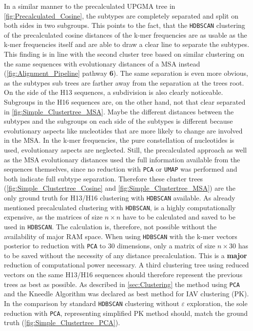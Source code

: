 In a similar manner to the precalculated \gls{UPGMA} tree in \autoref{fig:Precalculated_Cosine}, the subtypes are completely separated and split on both sides in two subgroups. This points to the fact, that the \texttt{HDBSCAN} clustering of the precalculated cosine distances of the k-mer frequencies are as usable as the k-mer frequencies itself and are able to draw a clear line to separate the subtypes. This finding is in line with the second cluster tree based on similar clustering on the same sequences with evolutionary distances of a \gls{MSA} instead (\autoref{fig:Alignment_Pipeline} pathway \textsf{\textbf{6}}). The same separation is even more obvious, as the subtypes sub trees are farther away from the separation at the trees root. On the side of the H13 sequences, a subdivision is also clearly noticeable. Subgroups in the H16 sequences are, on the other hand, not that clear separated in \autoref{fig:Simple_Clustertree_MSA}. Maybe the different distances between the subtypes and the subgroups on each side of the subtypes is different because evolutionary aspects like nucleotides that are more likely to change are involved in the \gls{MSA}. In the k-mer frequencies, the pure constellation of nucleotides is used, evolutionary aspects are neglected. Still, the precalculated approach as well as the \gls{MSA} evolutionary distances used the full information available from the sequences themselves, since no reduction with \texttt{PCA} or \texttt{UMAP} was performed and both indicate full subtype separation. Therefore these cluster trees (\autoref{fig:Simple_Clustertree_Cosine} and \autoref{fig:Simple_Clustertree_MSA}) are the only ground truth for H13/H16 clustering with \texttt{HDBSCAN} available. As already mentioned precalculated clustering with \texttt{HDBSCAN}, is a highly computationally expensive, as the matrices of size $n \times n$ have to be calculated and saved to be used in \texttt{HDBSCAN}. The calculation is, therefore, not possible without the availability of major RAM space. When using \texttt{HDBSCAN} with the k-mer vectors posterior to reduction with \texttt{PCA} to 30 dimensions, only a matrix of size $n\times 30$ has to be saved without the necessity of any distance precalculation. This is a \textbf{major} reduction of computational power necessary. A third clustering tree using reduced vectors on the same H13/H16 sequences should therefore represent the previous trees as best as possible. As described in \autoref{sec:Clustering} the method using \texttt{PCA} and the Kneedle Algorithm was declared as best method for \gls{IAV} clustering (PK). In the comparison by standard \texttt{HDBSCAN} clustering without $\varepsilon$ exploration, the sole reduction with \texttt{PCA}, representing simplified PK method should, match the ground truth (\autoref{fig:Simple_Clustertree_PCA}).

